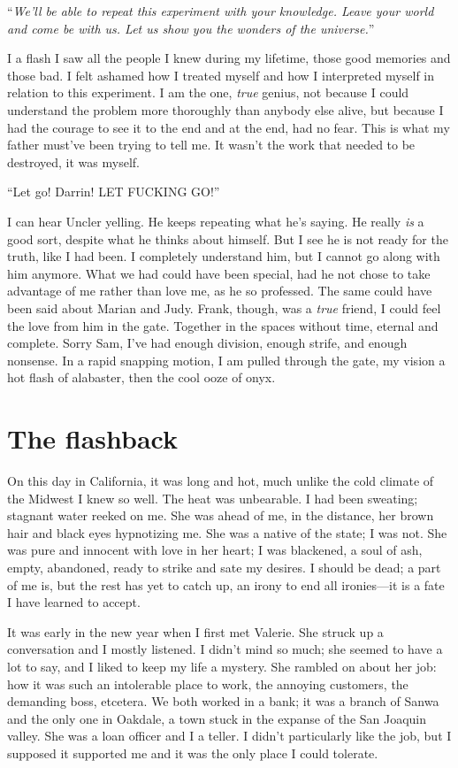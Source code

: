 ``\emph{We'll be able to repeat this experiment with your knowledge.
Leave your world and come be with us. Let us show you the wonders of the
universe.}''

I a flash I saw all the people I knew during my lifetime, those good
memories and those bad. I felt ashamed how I treated myself and how I
interpreted myself in relation to this experiment. I am the one,
\emph{true} genius, not because I could understand the problem more
thoroughly than anybody else alive, but because I had the courage to see
it to the end and at the end, had no fear. This is what my father
must've been trying to tell me. It wasn't the work that needed to be
destroyed, it was myself.

``Let go! Darrin! LET FUCKING GO!''

I can hear Uncler yelling. He keeps repeating what he's saying. He
really \emph{is} a good sort, despite what he thinks about himself. But
I see he is not ready for the truth, like I had been. I completely
understand him, but I cannot go along with him anymore. What we had
could have been special, had he not chose to take advantage of me rather
than love me, as he so professed. The same could have been said about
Marian and Judy. Frank, though, was a \emph{true} friend, I could feel
the love from him in the gate. Together in the spaces without time,
eternal and complete. Sorry Sam, I've had enough division, enough
strife, and enough nonsense. In a rapid snapping motion, I am pulled
through the gate, my vision a hot flash of alabaster, then the cool ooze
of onyx.

\section{The flashback}\label{the-flashback}

On this day in California, it was long and hot, much unlike the cold
climate of the Midwest I knew so well. The heat was unbearable. I had
been sweating; stagnant water reeked on me. She was ahead of me, in the
distance, her brown hair and black eyes hypnotizing me. She was a native
of the state; I was not. She was pure and innocent with love in her
heart; I was blackened, a soul of ash, empty, abandoned, ready to strike
and sate my desires. I should be dead; a part of me is, but the rest has
yet to catch up, an irony to end all ironies---it is a fate I have
learned to accept.

It was early in the new year when I first met Valerie. She struck up a
conversation and I mostly listened. I didn't mind so much; she seemed to
have a lot to say, and I liked to keep my life a mystery. She rambled on
about her job: how it was such an intolerable place to work, the
annoying customers, the demanding boss, etcetera. We both worked in a
bank; it was a branch of Sanwa and the only one in Oakdale, a town stuck
in the expanse of the San Joaquin valley. She was a loan officer and I a
teller. I didn't particularly like the job, but I supposed it supported
me and it was the only place I could tolerate.

